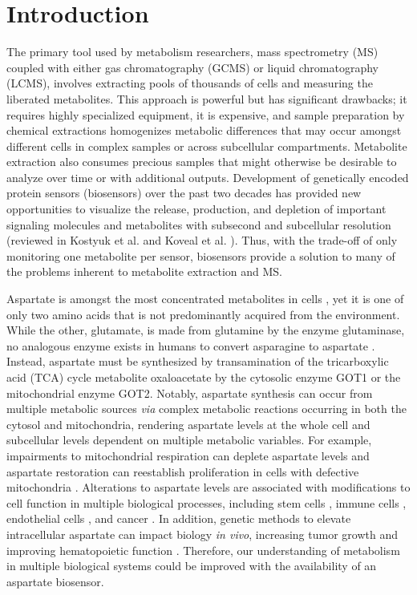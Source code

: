 \section{Introduction}
The primary tool used by metabolism researchers, mass spectrometry (MS) coupled with either gas chromatography (GCMS) or liquid chromatography (LCMS), involves extracting pools of thousands of cells and measuring the liberated metabolites.
This approach is powerful but has significant drawbacks; it requires highly specialized equipment, it is expensive, and sample preparation by chemical extractions homogenizes metabolic differences that may occur amongst different cells in complex samples or across subcellular compartments.
Metabolite extraction also consumes precious samples that might otherwise be desirable to analyze over time or with additional outputs.
Development of genetically encoded protein sensors (biosensors) over the past two decades has provided new opportunities to visualize the release, production, and depletion of important signaling molecules and metabolites with subsecond and subcellular resolution (reviewed in Kostyuk et al. and Koveal et al. \cite{Kostyuk2019-qc, Koveal2020-cl}).
Thus, with the trade-off of only monitoring one metabolite per sensor, biosensors provide a solution to many of the problems inherent to metabolite extraction and MS.

Aspartate is amongst the most concentrated metabolites in cells \cite{Park2016-ap}, yet it is one of only two amino acids that is not predominantly acquired from the environment.
While the other, glutamate, is made from glutamine by the enzyme glutaminase, no analogous enzyme exists in humans to convert asparagine to aspartate \cite{Sullivan2018-gz}.
Instead, aspartate must be synthesized by transamination of the tricarboxylic acid (TCA) cycle metabolite oxaloacetate by the cytosolic enzyme GOT1 or the mitochondrial enzyme GOT2.
Notably, aspartate synthesis can occur from multiple metabolic sources \textit{via} complex metabolic reactions occurring in both the cytosol and mitochondria, rendering aspartate levels at the whole cell and subcellular levels dependent on multiple metabolic variables.
For example, impairments to mitochondrial respiration can deplete aspartate levels and aspartate restoration can reestablish proliferation in cells with defective mitochondria \cite{Sullivan2015-xf, Birsoy2015-pg, Cardaci2015-xy, Hart2023-gp}.
Alterations to aspartate levels are associated with modifications to cell function in multiple biological processes, including stem cells \cite{Tournaire2022-ut, Arnold2022-ft}, immune cells \cite{Bailis2019-mf}, endothelial cells \cite{Diebold2019-hh}, and cancer \cite{Helenius2021-ht}.
In addition, genetic methods to elevate intracellular aspartate can impact biology \textit{in vivo}, increasing tumor growth \cite{Sullivan2018-gz, Garcia-Bermudez2018-mj} and improving hematopoietic function \cite{Qi2021-jv}.
Therefore, our understanding of metabolism in multiple biological systems could be improved with the availability of an aspartate biosensor.

